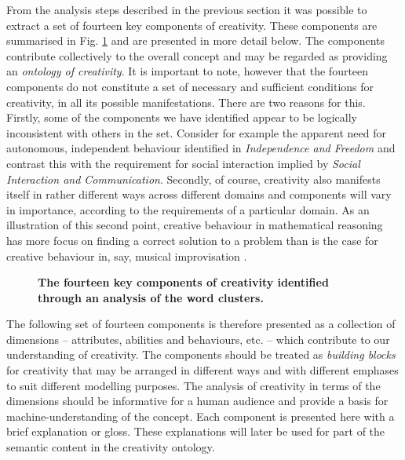 \documentclass[10pt,letterpaper]{article}
\begin{document}
From the analysis steps described in the previous section it was possible to extract a set of fourteen key components of creativity. These components are summarised in Fig. \ref{components} 
and are presented in more detail below. The components contribute collectively to the overall concept and may be regarded as providing an {\em ontology of creativity\/}.  It is important to note, however that the fourteen components do not constitute a set of necessary and sufficient conditions for creativity, in all its possible manifestations. There are two reasons for this. Firstly, some of the components we have identified appear to be logically inconsistent with others in the set. Consider for example the apparent need for autonomous, independent behaviour identified in {\em Independence and Freedom\/} and contrast this with the requirement for social interaction implied by {\em Social Interaction and Communication\/}. %
Secondly, of course, creativity %
also manifests itself in rather different ways across different domains \cite{plucker04} and components will vary in importance, according to the requirements of a particular domain. As an illustration of this second point, %
creative behaviour in mathematical reasoning has more focus on finding a correct solution to a problem than is the case for creative behaviour in, say,  musical improvisation \cite{colton08,jordanous12jims}. 

\begin{figure} 
\caption{{\bf The fourteen key components of creativity identified through an analysis of the word clusters.}}
\label{components}
\end{figure}


The following set of fourteen components is therefore presented as a collection of dimensions -- attributes, abilities and behaviours, etc. -- which contribute to our understanding of creativity. The components should be treated as {\em building blocks} for creativity that may be arranged in different ways and with different emphases to suit different modelling purposes. The analysis of creativity in terms of the dimensions should be informative for a human audience and provide a basis for machine-understanding of the concept. %
 Each component is presented here with a brief explanation or gloss. These explanations will later be used for part of the semantic content in the creativity ontology.
\end{document}
